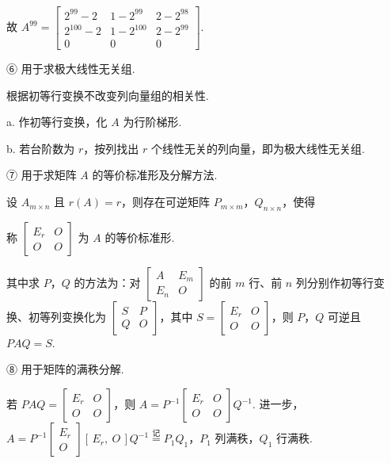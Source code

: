 故 $A^{99}=\begin{bmatrix}2^{99}-2&1-2^{99}&2-2^{98}\\2^{100}-2&1-2^{100}&2-2^{99}\\0&0&0\end{bmatrix}$.

⑥ 用于求极大线性无关组.

根据初等行变换不改变列向量组的相关性.

a. 作初等行变换，化 $A$ 为行阶梯形.


b. 若台阶数为 $r$，按列找出 $r$ 个线性无关的列向量，即为极大线性无关组.

⑦ 用于求矩阵 $A$ 的等价标准形及分解方法.


设 $A_{m\times n}$ 且 $r(A)=r$，则存在可逆矩阵 $P_{m\times m}$，$Q_{n\times n}$，使得


称 $\begin{bmatrix}E_r&O\\O&O\end{bmatrix}$ 为 $A$ 的等价标准形.

其中求 $P$，$Q$ 的方法为：对 $\begin{bmatrix}A&E_m\\E_n&O\end{bmatrix}$ 的前 $m$ 行、前 $n$ 列分别作初等行变换、初等列变换化为 $\begin{bmatrix}S&P\\Q&O\end{bmatrix}$，其中 $S=\begin{bmatrix}E_r&O\\O&O\end{bmatrix}$，则 $P$，$Q$ 可逆且 $PAQ=S$.

⑧ 用于矩阵的满秩分解.

若 $PAQ=\begin{bmatrix}E_r&O\\O&O\end{bmatrix}$，则 $A=P^{-1}\begin{bmatrix}E_r&O\\O&O\end{bmatrix}Q^{-1}$. 进一步，$A=P^{-1}\begin{bmatrix}E_r\\O\end{bmatrix}[\,E_r,\ O\,]Q^{-1}\overset{\text{记}}{=}P_1Q_1$，$P_1$ 列满秩，$Q_1$ 行满秩.

